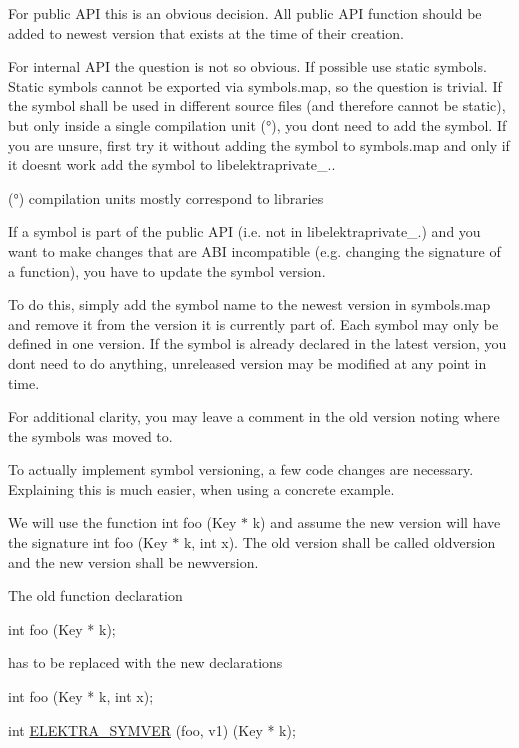 For public A\+PI this is an obvious decision. All public A\+PI function should be added to newest version that exists at the time of their creation.

For internal A\+PI the question is not so obvious. If possible use static symbols. Static symbols cannot be exported via {\ttfamily symbols.\+map}, so the question is trivial. If the symbol shall be used in different source files (and therefore cannot be static), but only inside a single compilation unit (°), you don\textquotesingle{}t need to add the symbol. If you are unsure, first try it without adding the symbol to {\ttfamily symbols.\+map} and only if it doesn\textquotesingle{}t work add the symbol to {\ttfamily libelektraprivate\+\_.}.

(°) compilation units mostly correspond to libraries

If a symbol is part of the public A\+PI (i.\+e. not in {\ttfamily libelektraprivate\+\_.}) and you want to make changes that are A\+BI incompatible (e.\+g. changing the signature of a function), you have to update the symbol version.

To do this, simply add the symbol name to the newest version in {\ttfamily symbols.\+map} and remove it from the version it is currently part of. Each symbol may only be defined in one version. If the symbol is already declared in the latest version, you don\textquotesingle{}t need to do anything, unreleased version may be modified at any point in time.

For additional clarity, you may leave a comment in the old version noting where the symbols was moved to.

To actually implement symbol versioning, a few code changes are necessary. Explaining this is much easier, when using a concrete example.

We will use the function {\ttfamily int foo (Key $\ast$ k)} and assume the new version will have the signature {\ttfamily int foo (Key $\ast$ k, int x)}. The old version shall be called {\ttfamily oldversion} and the new version shall be {\ttfamily newversion}.

The old function declaration


\begin{DoxyCode}
\textcolor{keywordtype}{int} foo (Key * k);
\end{DoxyCode}


has to be replaced with the new declarations


\begin{DoxyCode}
\textcolor{keywordtype}{int} foo (Key * k, \textcolor{keywordtype}{int} x);

\textcolor{keywordtype}{int} \hyperlink{kdbmacros_8h_a5dd9e2d021e60949f63eeb88b8b2558c}{ELEKTRA\_SYMVER} (foo, v1) (Key * k);
\end{DoxyCode}



